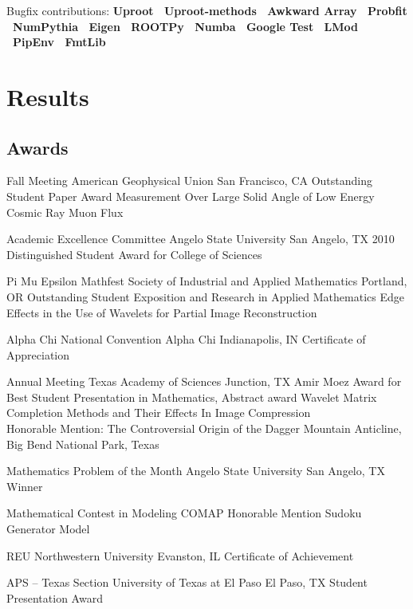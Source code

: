 \documentclass[10pt,letterpaper,english]{moderncv}
\begin{document}
Bugfix contributions: \textbf{
	Uproot  \bullet\ 
	Uproot-methods \bullet\ 
	Awkward Array \bullet\ 
	Probfit  \bullet\ 
	NumPythia \bullet\ 
	Eigen  \bullet\ 
    ROOTPy \bullet\ 
    Numba \bullet\  
    Google Test  \bullet\ 
    LMod \bullet\
    PipEnv \bullet\ 
    FmtLib
}



\section{Results}
\subsection{Awards}

\cvaward{2015}
{Fall Meeting}
{American Geophysical Union}
{San Francisco, CA}
{Outstanding Student Paper Award}%
{Measurement Over Large Solid Angle of Low Energy Cosmic Ray Muon Flux}

{Academic Excellence Committee}
{Angelo State University}
{San Angelo, TX}
{2010 Distinguished Student Award for College of Sciences}

{Pi Mu Epsilon Mathfest}
{Society of Industrial and Applied Mathematics}
{Portland, OR}
{Outstanding Student Exposition and Research in Applied Mathematics}%
{Edge Effects in the Use of Wavelets for Partial Image Reconstruction}

\cvaward{2009}
{Alpha Chi National Convention}
{Alpha Chi}
{Indianapolis, IN}
{Certificate of Appreciation}

{Annual Meeting}
{Texas Academy of Sciences}
{Junction, TX}
{Amir Moez Award for Best Student Presentation in Mathematics, Abstract award}%
{Wavelet Matrix Completion Methods and Their Effects In Image Compression\\
\textnormal{Honorable Mention:}
The Controversial Origin of the Dagger Mountain Anticline, Big Bend National Park, Texas}


\cvaward{2009}
{Mathematics Problem of the Month}
{Angelo State University}
{San Angelo, TX}
{Winner}

\cvaward*{2008}
{Mathematical Contest in Modeling}
{COMAP}
{}
{Honorable Mention}%
{Sudoku Generator Model}

{REU}
{Northwestern University}
{Evanston, IL}
{Certificate of Achievement}

\cvaward{2008}
{APS -- Texas Section}
{University of Texas at El Paso}
{El Paso, TX}
{Student Presentation Award}
\end{document}
